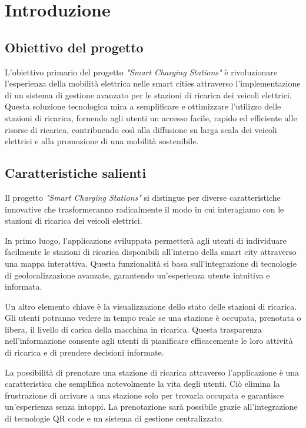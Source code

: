 

\section{Introduzione}

\subsection{Obiettivo del progetto}
L'obiettivo primario del progetto \textit{"Smart Charging Stations"} è rivoluzionare l'esperienza della
mobilità elettrica nelle smart cities attraverso l'implementazione di un sistema di gestione avanzato
per le stazioni di ricarica dei veicoli elettrici. Questa soluzione tecnologica mira a semplificare e
ottimizzare l'utilizzo delle stazioni di ricarica, fornendo agli utenti un accesso facile, rapido ed
efficiente alle risorse di ricarica, contribuendo così alla diffusione su larga scala dei veicoli elettrici
e alla promozione di una mobilità sostenibile.

\subsection{Caratteristiche salienti}
Il progetto \textit{"Smart Charging Stations"} si distingue per diverse caratteristiche innovative
che trasformeranno radicalmente il modo in cui interagiamo con le stazioni di ricarica dei veicoli elettrici.

In primo luogo, l'applicazione sviluppata permetterà agli utenti di individuare facilmente le
stazioni di ricarica disponibili all'interno della smart city attraverso una mappa interattiva.
Questa funzionalità si basa sull'integrazione di tecnologie di geolocalizzazione avanzate,
garantendo un'esperienza utente intuitiva e informata.

Un altro elemento chiave è la visualizzazione dello stato delle stazioni di ricarica.
Gli utenti potranno vedere in tempo reale se una stazione è occupata, prenotata o libera, il livello di
carica della macchina in ricarica. Questa trasparenza nell'informazione
consente agli utenti di pianificare efficacemente le loro attività di ricarica e di prendere decisioni
informate.

La possibilità di prenotare una stazione di ricarica attraverso l'applicazione è una caratteristica
che semplifica notevolmente la vita degli utenti. Ciò elimina la frustrazione di arrivare a una stazione
solo per trovarla occupata e garantisce un'esperienza senza intoppi. La prenotazione sarà possibile grazie
all'integrazione di tecnologie QR code e un sistema di gestione centralizzato.

